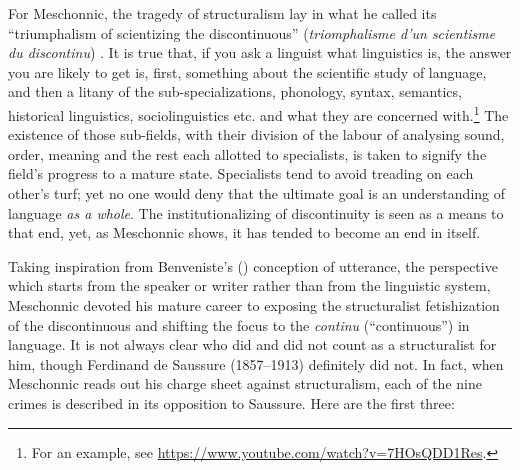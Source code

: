 \documentclass[output=paper]{langscibook}
\begin{document}
\largerpage[-1]For Meschonnic, the tragedy of structuralism lay in what he called its ``triumphalism of scientizing the discontinuous'' (\emph{triomphalisme d’un scientisme du discontinu}) \citep[20]{Meschonnic2009}. It is true that, if you ask a linguist what linguistics is, the answer you are likely to get is, first, something about the scientific study of language, and then a litany of the sub-specializations, phonology, syntax, semantics, historical linguistics, sociolinguistics etc. and what they are concerned with.\footnote{For an example, see \url{https://www.youtube.com/watch?v=7HOsQDD1Res}.} The existence of those sub-fields, with their division of the labour of analysing sound, order, meaning and the rest each allotted to specialists, is taken to signify the field's progress to a mature state. Specialists tend to avoid treading on each other's turf; yet no one would deny that the ultimate goal is an understanding of language \emph{as a whole}. The institutionalizing of discontinuity is seen as a means to that end, yet, as Meschonnic shows, it has tended to become an end in itself.

Taking inspiration from Benveniste's (\citeyear{Benveniste1970appareil}) conception of utterance, the perspective which starts from the speaker or writer rather than from the linguistic system, Meschonnic devoted his mature career to exposing the structuralist fetishization of the discontinuous and shifting the focus to the \emph{continu} (``continuous'') in language. It is not always clear who did and did not count as a structuralist for him, though Ferdinand de Saussure (1857--1913) definitely did not. In fact, when Meschonnic reads out his charge sheet against structuralism, each of the nine crimes is described in its opposition to Saussure. Here are the first three:
\end{document}
